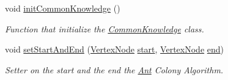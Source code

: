 \begin{DoxyCompactItemize}
void \hyperlink{classCommonKnowledge_a02951b11f4a27b4b2a99b4b82a57f467}{init\+Common\+Knowledge} ()
\begin{DoxyCompactList}\small\item\em Function that initialize the \hyperlink{classCommonKnowledge}{Common\+Knowledge} class. \end{DoxyCompactList}\item 
void \hyperlink{classCommonKnowledge_aa62a58eb879f2b8e331ca27f9294162e}{set\+Start\+And\+End} (\hyperlink{classVertexNode}{Vertex\+Node} \hyperlink{classCommonKnowledge_a968607c5b3027dc7db9178375a2071f2}{start}, \hyperlink{classVertexNode}{Vertex\+Node} \hyperlink{classCommonKnowledge_a32a5f87ad72c95bbe3e3aabca913a5a6}{end})
\begin{DoxyCompactList}\small\item\em Setter on the start and the end the \hyperlink{classAnt}{Ant} Colony Algorithm. \end{DoxyCompactList}\end{DoxyCompactItemize}
